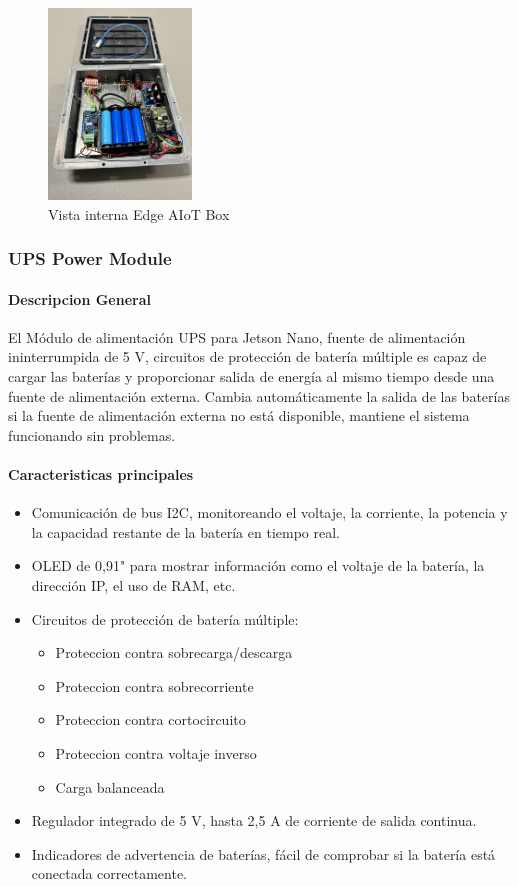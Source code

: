 \begin{figure}[H]
    \centering
    \includegraphics[height=2in]{images/edge_inside.png}
    \captionsetup{font=footnotesize}
    \caption{Vista interna Edge AIoT Box}
    \label{fig:img5_3}
\end{figure}

\subsubsection{UPS Power Module}
\label{subsection:subsubsec5_1_1}
\paragraph{Descripcion General}
El Módulo de alimentación UPS para Jetson Nano, fuente de alimentación ininterrumpida de 5 V, circuitos de protección de batería múltiple es capaz de cargar las baterías y proporcionar salida de energía al mismo tiempo desde una fuente de alimentación externa.
Cambia automáticamente la salida de las baterías si la fuente de alimentación externa no está disponible, mantiene el sistema funcionando sin problemas.

\paragraph{Caracteristicas principales}
\begin{itemize}
    \item Comunicación de bus I2C, monitoreando el voltaje, la corriente, la potencia y la capacidad restante de la batería en tiempo real.
    \item OLED de 0,91" para mostrar información como el voltaje de la batería, la dirección IP, el uso de RAM, etc.
    \item Circuitos de protección de batería múltiple:
    \begin{itemize}
        \item Proteccion contra sobrecarga/descarga
        \item Proteccion contra sobrecorriente
        \item Proteccion contra cortocircuito
        \item Proteccion contra voltaje inverso
        \item Carga balanceada
    \end{itemize} 
    \item Regulador integrado de 5 V, hasta 2,5 A de corriente de salida continua.
    \item Indicadores de advertencia de baterías, fácil de comprobar si la batería está conectada correctamente.
\end{itemize}

